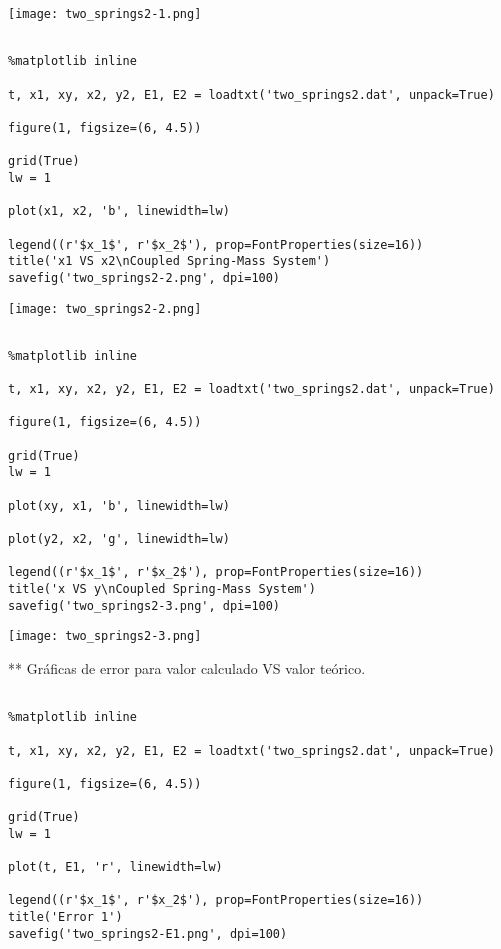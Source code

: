 \documentclass{article} %
\begin{document}
\begin{center}
 	\texttt{[image: two\_springs2-1.png]}
 \end{center}





\begin{verbatim} 

%matplotlib inline

t, x1, xy, x2, y2, E1, E2 = loadtxt('two_springs2.dat', unpack=True)

figure(1, figsize=(6, 4.5))

grid(True)
lw = 1

plot(x1, x2, 'b', linewidth=lw)

legend((r'$x_1$', r'$x_2$'), prop=FontProperties(size=16))
title('x1 VS x2\nCoupled Spring-Mass System')
savefig('two_springs2-2.png', dpi=100)

\end{verbatim}


\begin{center}
 	\texttt{[image: two\_springs2-2.png]}
 \end{center}


\begin{verbatim} 

%matplotlib inline

t, x1, xy, x2, y2, E1, E2 = loadtxt('two_springs2.dat', unpack=True)

figure(1, figsize=(6, 4.5))

grid(True)
lw = 1

plot(xy, x1, 'b', linewidth=lw)

plot(y2, x2, 'g', linewidth=lw)

legend((r'$x_1$', r'$x_2$'), prop=FontProperties(size=16))
title('x VS y\nCoupled Spring-Mass System')
savefig('two_springs2-3.png', dpi=100)

\end{verbatim}



\begin{center}
 	\texttt{[image: two\_springs2-3.png]}
 \end{center}



** Gráficas de error para valor calculado VS valor teórico.


\begin{verbatim} 

%matplotlib inline

t, x1, xy, x2, y2, E1, E2 = loadtxt('two_springs2.dat', unpack=True)

figure(1, figsize=(6, 4.5))

grid(True)
lw = 1

plot(t, E1, 'r', linewidth=lw)

legend((r'$x_1$', r'$x_2$'), prop=FontProperties(size=16))
title('Error 1')
savefig('two_springs2-E1.png', dpi=100)

\end{verbatim}
\end{document}
